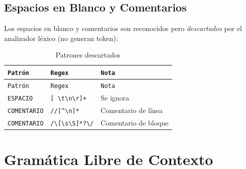 \documentclass[12pt, letterpaper]{article}
\theoremstyle{definition}
\newcommand{\rx}[1]{\texttt{\textcolor{blue!70!black}{#1}}}
\begin{document}
\begin{center}
\begin{longtable}{|p{3.5cm}|p{5.5cm}|p{5cm}|}
\end{longtable}
\end{center}

\subsection{Espacios en Blanco y Comentarios}

Los espacios en blanco y comentarios son reconocidos pero \emph{descartados}
por el analizador léxico (no generan token):

\begin{center}
\begin{longtable}{|p{3.5cm}|p{5.5cm}|p{5cm}|}
    \caption{Patrones descartados} \\
    \hline
    \texttt{Patrón} & \texttt{Regex} & \texttt{Nota} \\
    \hline
    \endfirsthead
    \hline
    \texttt{Patrón} & \texttt{Regex} & \texttt{Nota} \\
    \hline
    \endhead
    \hline
    \endfoot
    \hline
    \endlastfoot

    \texttt{ESPACIO}      & \rx{[ \textbackslash t\textbackslash n\textbackslash r]+}      & Se ignora \\ \hline
    \texttt{COMENTARIO}   & \rx{//[\textasciicircum\textbackslash n]*}                     & Comentario de línea \\ \hline
    \texttt{COMENTARIO}   & \rx{/\textbackslash*[\textbackslash s\textbackslash S]*?\textbackslash*/} & Comentario de bloque \\ \hline

\end{longtable}
\end{center}

\section{Gramática Libre de Contexto}
\end{document}
